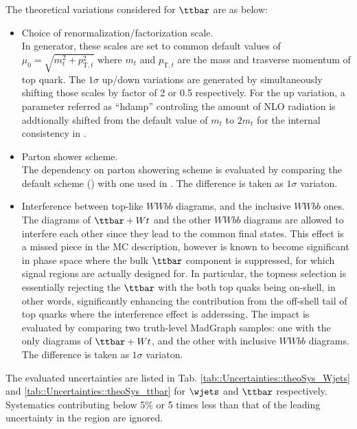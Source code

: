 The theoretical variations considered for $\ttbar$ are as below:
\begin{itemize}
\item Choice of renormalization/factorization scale.\\
In \powhegbox generator, these scales are set to common default values of $\mu_0 = \sqrt{m_t^2+p_{\mathrm{T},t}^2}$ where $m_t$ and $p_{\mathrm{T},t}$ are the mass and trasverse momentum of top quark.
The $1\sigma$ up/down variations are generated by simultaneously shifting those scales by factor of 2 or 0.5 respectively.  
For the up variation, a parameter referred as ``hdamp'' \cite{ttbarGen_ATLAS_Run1} controling the amount of NLO radiation is addtionally shifted from the default value of $m_t$ to $2m_t$ for the internal consistency in \powhegbox. 

\item Parton shower scheme.\\
The dependency on parton showering scheme is evaluated by comparing the default scheme (\pythiasix) with one used in \herwig.
The difference is taken as $1\sigma$ variaton.

\item Interference between top-like $WWbb$ diagrams, and the inclusive $WWbb$ ones.\\
The diagrams of $\ttbar+Wt$ and the other $WWbb$ diagrams are allowed to interfere each other since they lead to the common final states.
This effect is a missed piece in the MC description, however is known to become significant in phase space where the bulk $\ttbar$ component is suppressed, for which signal regions are actually designed for.
In particular, the topness selection is essentially rejecting the $\ttbar$ with the both top quaks being on-shell, in other words, significantly enhancing the contribution from the off-shell tail of top quarks where the interference effect is adderssing. The impact is evaluated by comparing two truth-level MadGraph samples: one with the only diagrams of $\ttbar+Wt$, and the other with inclusive $WWbb$ diagrams.
The difference is taken as $1\sigma$ variaton.
\end{itemize}
The evaluated uncertainties are listed in Tab. \ref{tab::Uncertainties::theoSys_Wjets} and \ref{tab::Uncertainties::theoSys_ttbar} for $\wjets$ and $\ttbar$ respectively. Systematics contributing below 5$\%$ or 5 times less than that of the leading uncertainty in the region are ignored. \\

